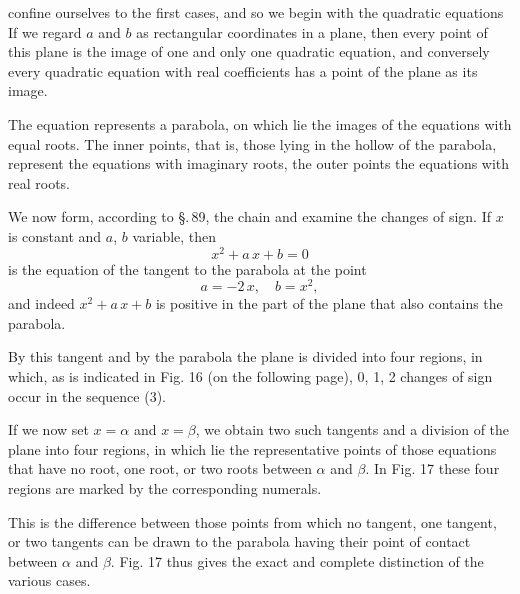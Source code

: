 confine ourselves to the first cases, and so we begin with the quadratic equations
If we regard $a$ and $b$ as rectangular coordinates in a plane, then every point of this plane is the image of one and only one quadratic equation, and conversely every quadratic equation with real coefficients has a point of the plane as its image.

The equation
represents a parabola, on which lie the images of the equations with equal roots. The inner points, that is, those lying in the hollow of the parabola, represent the equations with imaginary roots, the outer points the equations with real roots.

We now form, according to \S.\,89, the  chain
and examine the changes of sign. If $x$ is constant and $a$, $b$ variable, then
\[
x^2 + a\,x + b = 0
\]
is the equation of the tangent to the parabola at the point
\[
a = -2\,x,\quad b = x^2,
\]
and indeed $x^2 + a\,x + b$ is positive in the part of the plane that also contains the parabola.

By this tangent and by the parabola the plane is divided into four regions, in which, as is indicated in Fig. 16 (on the following page), 0, 1, 2 changes of sign occur in the sequence (3).

If we now set $x = \alpha$ and $x = \beta$, we obtain two such tangents and a division of the plane into four regions, in which lie the representative points of those equations that have no root, one root, or two roots between $\alpha$ and $\beta$. In Fig. 17 these four regions are marked by the corresponding numerals.

This is the difference between those points from which no tangent, one tangent, or two tangents can be drawn to the parabola having their point of contact between $\alpha$ and $\beta$. Fig. 17 thus gives the exact and complete distinction of the various cases.

